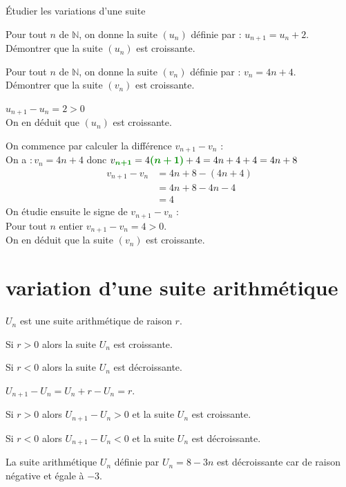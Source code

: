 \begin{bmethodet}{Étudier les variations d'une suite}
\begin{enumMet}
\item Pour tout $n$ de $\mathbb{N}$, on donne la suite $\left(u_{n}\right)$ définie par : $u_{n+1}=u_{n}+2$.\\
Démontrer que la suite $\left(u_{n}\right)$ est croissante.
\item Pour tout $n$ de $\mathbb{N}$, on donne la suite $\left(v_{n}\right)$ définie par : $v_{n}=4 n+4$.\\
Démontrer que la suite $\left(v_{n}\right)$ est croissante.
\end{enumMet}
\begin{enumMet}
\item $u_{n+1}-u_{n}=2>0$\\
On en déduit que $\left(u_{n}\right)$ est croissante.
\item On commence par calculer la différence $v_{n+1}-v_{n}$ :\\
On a $: v_{n}=4 n+4$ donc $v_{\mVert{n+1}}=4\mVert{(n+1)}+4=4 n+4+4=4 n+8$
\begin{align*}
v_{n+1}-v_{n}&=4 n+8-(4 n+4) \\
&=4 n+8-4 n-4 \\
&=4
\end{align*}
On étudie ensuite le signe de $v_{n+1}-v_{n}$ :\\
Pour tout $n$ entier $v_{n+1}-v_{n}=4>0$.\\
On en déduit que la suite $\left(v_{n}\right)$ est croissante.
\end{enumMet}
\end{bmethodet}


\section{variation d'une suite arithmétique}

\begin{bprop}
    $U_n$ est une suite arithmétique de raison $r$.
    \begin{itemDef}
    	\item Si $r > 0$ alors la suite $U_n$ est croissante.
    	\item Si $r < 0$ alors la suite $U_n$ est décroissante.
    \end{itemDef}
\end{bprop}

\begin{bdemo}
    $U_{n+1}-U_n=U_n+r-U_n=r$.
    \begin{itemDem}
    	\item Si $r > 0$ alors $U_{n+1}-U_n>0$  et la suite $U_n$ est croissante.
    	\item Si $r < 0$ alors $U_{n+1}-U_n<0$ et la suite $U_n$ est décroissante.
    \end{itemDem}
\end{bdemo}
\begin{bexemple}
    La suite arithmétique $U_n$ définie par $U_n=8-3n$ est décroissante car de raison négative et égale à $-3$.
\end{bexemple}


